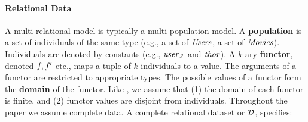\documentclass{article}
\begin{document}
 
 \paragraph{Relational Data} 

 
A multi-relational model is typically a multi-population model. A \textbf{population} is a set of individuals of the same type (e.g., a set of $\it{Users}$, a set of $\it{Movies}$). Individuals are 
denoted by %
constants (e.g., $\it{user}_{3}$ and $\it{thor}$). 
%
A $k$-ary \textbf{functor}, denoted $f,f'$ etc.,  maps a tuple of $k$ individuals to a value. 
The arguments of a functor are restricted to appropriate types.
%
The possible values of a functor form the \textbf{domain} of the functor.  
Like \cite{Poole2003},  we assume  that (1) the domain of each functor is finite, and (2) functor values are disjoint from individuals. 
%
 Throughout the paper we assume complete data. A complete relational dataset or  $\mathcal{D}$, specifies:
\end{document}
